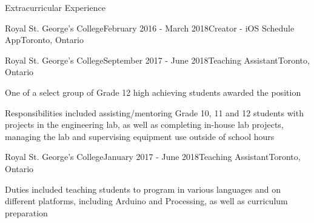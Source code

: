 \documentclass{resume} %
\begin{document}
\begin{rSection}{Extracurricular Experience}
\begin{rSubsection}{Royal St. George's College}{February 2016 - March
    2018}{Creator - iOS Schedule App}{Toronto, Ontario}
\end{rSubsection}

\begin{rSubsection}{Royal St. George's College}{September 2017 - June
    2018}{Teaching Assistant}{Toronto, Ontario}
\item One of a select group of Grade 12 high achieving students awarded the position
\item Responsibilities included assisting/mentoring Grade 10, 11 and 12 students with projects in
  the engineering lab, as well as completing in-house lab projects, managing the lab and
  supervising equipment use outside of school hours
\end{rSubsection}

\begin{rSubsection}{Royal St. George's College}{January 2017 - June
    2018}{Teaching Assistant}{Toronto, Ontario}
\item Duties included teaching students to program in various languages and on different
  platforms, including Arduino and Processing, as well as curriculum preparation
\end{rSubsection}

\end{rSection}








\end{document}
